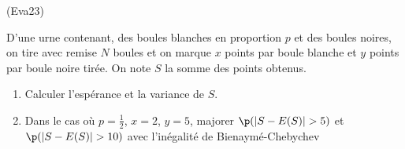 \begin{tiny}(Eva23)\end{tiny} D'une urne contenant, des boules blanches en proportion $p$ et des boules noires, on tire avec remise $N$ boules et on marque $x$ points par boule blanche et $y$ points par boule noire tirée. On note $S$ la somme des points obtenus.
\begin{enumerate}
  \item Calculer l'espérance et la variance de $S$.
  \item Dans le cas où $p=\frac{1}{2}$, $x=2$, $y=5$, majorer $\p(|S-E(S)|>5)$ et $\p(|S-E(S)|>10)$ avec l'inégalité de Bienaymé-Chebychev
\end{enumerate}

